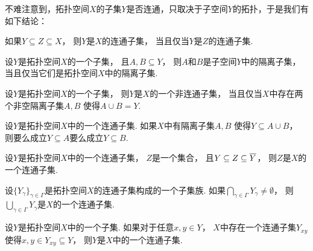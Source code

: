 不难注意到，拓扑空间\(X\)的子集\(Y\)是否连通，只取决于子空间\(Y\)的拓扑，于是我们有如下结论：
\begin{proposition}
如果\(Y \subseteq Z \subseteq X\)，
则\(Y\)是\(X\)的连通子集，
当且仅当\(Y\)是\(Z\)的连通子集.
\end{proposition}

\begin{theorem}
设\(Y\)是拓扑空间\(X\)的一个子集，
且\(A,B \subseteq Y\)，
则\(A\)和\(B\)是子空间\(Y\)中的隔离子集，
当且仅当它们是拓扑空间\(X\)中的隔离子集.
\end{theorem}

\begin{corollary}
设\(Y\)是拓扑空间\(X\)的一个子集，
则\(Y\)是\(X\)的一个非连通子集，
当且仅当\(X\)中存在两个非空隔离子集\(A,B\)
使得\(A \cup B = Y\).
\end{corollary}

\begin{theorem}
设\(Y\)是拓扑空间\(X\)中的一个连通子集.
如果\(X\)中有隔离子集\(A,B\)
使得\(Y \subseteq A \cup B\)，
则要么成立\(Y \subseteq A\)要么成立\(Y \subseteq B\).
\end{theorem}

\begin{theorem}\label{theorem:连通空间.连通性的夹逼准则}
设\(Y\)是拓扑空间\(X\)中的一个连通子集，
\(Z\)是一个集合，
且\(Y \subseteq Z \subseteq \overline{Y}\)，
则\(Z\)是\(X\)的一个连通子集.
\end{theorem}

\begin{theorem}
设\(\{Y_\gamma\}_{\gamma \in \Gamma}\)是拓扑空间\(X\)的连通子集构成的一个子集族.
如果\(\bigcap_{\gamma \in \Gamma} Y_\gamma \neq \emptyset\)，
则\(\bigcup_{\gamma \in \Gamma} Y_\gamma\)是\(X\)的一个连通子集.
\end{theorem}

\begin{theorem}
设\(Y\)是拓扑空间\(X\)中的一个子集.
如果对于任意\(x,y \in Y\)，
\(X\)中存在一个连通子集\(Y_{xy}\)
使得\(x,y \in Y_{xy} \subseteq Y\)，
则\(Y\)是\(X\)中的一个连通子集.
\end{theorem}

